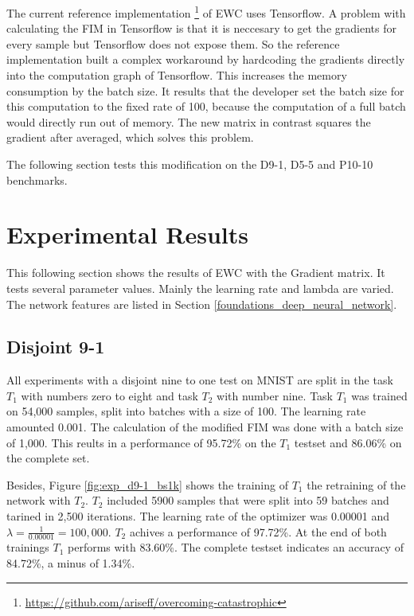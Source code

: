 The current reference implementation \footnote[1]{\url{https://github.com/ariseff/overcoming-catastrophic}} of EWC uses Tensorflow.
A problem with calculating the FIM in Tensorflow is that it is neccesary to get the gradients for every sample but Tensorflow does not expose them.
So the reference implementation built a complex workaround by hardcoding the gradients directly into the computation graph of Tensorflow.
This increases the memory consumption by the batch size.
It results that the developer set the batch size for this computation to the fixed rate of 100, because the computation of a full batch would directly run out of memory.
\cite{github_ewc_issue_one}
The new matrix in contrast squares the gradient after averaged, which solves this problem.

The following section tests this modification on the D9-1, D5-5 and P10-10 benchmarks.

\newpage
\section{Experimental Results}

This following section shows the results of EWC with the Gradient matrix.
It tests several parameter values.
Mainly the learning rate and lambda are varied.
The network features are listed in Section \ref{foundations_deep_neural_network}.

\subsection{Disjoint 9-1}

All experiments with a disjoint nine to one test on MNIST are split in the task $T_1$ with numbers zero to eight and task $T_2$ with number nine.
Task $T_1$ was trained on 54,000 samples, split into batches with a size of 100.
The learning rate amounted 0.001.
The calculation of the modified FIM was done with a batch size of 1,000.
This reults in a performance of 95.72\% on the $T_1$ testset and 86.06\% on the complete set.

Besides, Figure \ref{fig:exp_d9-1_bs1k} shows the training of $T_1$ the retraining of the network with $T_2$.
$T_2$ included 5900 samples that were split into 59 batches and tarined in 2,500 iterations.
The learning rate of the optimizer was 0.00001 and $\lambda = \frac{1}{0.00001} = 100,000$.
$T_2$ achives a performance of 97.72\%.
At the end of both trainings $T_1$ performs with 83.60\%.
The complete testset indicates an accuracy of 84.72\%, a minus of 1.34\%.

